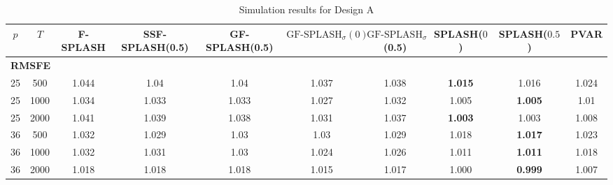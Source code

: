 \begin{landscape}
    \bgroup
    \def\arraystretch{1.3}
    \begin{table}[!h]
    \footnotesize
    \centering
    \caption{Simulation results for Design A}
    \label{tab:results_designA}
    \begin{tabular}{cccccccccc}    
    \hline \hline
    $p$  &  $T$   &  F-SPLASH  &  SSF-SPLASH(0.5)  &  GF-SPLASH(0.5)  &  $\text{GF-SPLASH}_\sigma(0)$  &  $\text{GF-SPLASH}_\sigma$(0.5)  &  SPLASH($0$)  &  SPLASH($0.5$)  &  PVAR  \\
    \hline
    \multicolumn{10}{l}{\textbf{RMSFE}} \\
	\hline
	 25  & 500  &         1.044         &                 1.04                  &                       1.04                       &                     1.037                      &                      1.038                       & \textbf{1.015}           & 1.016                      &       1.024       \\
	 25  & 1000 &         1.034         &                 1.033                 &                      1.033                       &                     1.027                      &                      1.032                       & 1.005                    & \textbf{1.005}             &       1.01        \\
	 25  & 2000 &         1.041         &                 1.039                 &                      1.038                       &                     1.031                      &                      1.037                       & \textbf{1.003}           & 1.003                      &       1.008       \\
	 36  & 500  &         1.032         &                 1.029                 &                       1.03                       &                      1.03                      &                      1.029                       & 1.018                    & \textbf{1.017}             &       1.023       \\
	 36  & 1000 &         1.032         &                 1.031                 &                       1.03                       &                     1.024                      &                      1.026                       & 1.011                    & \textbf{1.011}             &       1.018       \\
	 36  & 2000 &         1.018         &                 1.018                 &                      1.018                       &                     1.015                      &                      1.017                       & 1.000                    & \textbf{0.999}             &       1.007       \\

\end{tabular}
\end{table}
\end{landscape}
